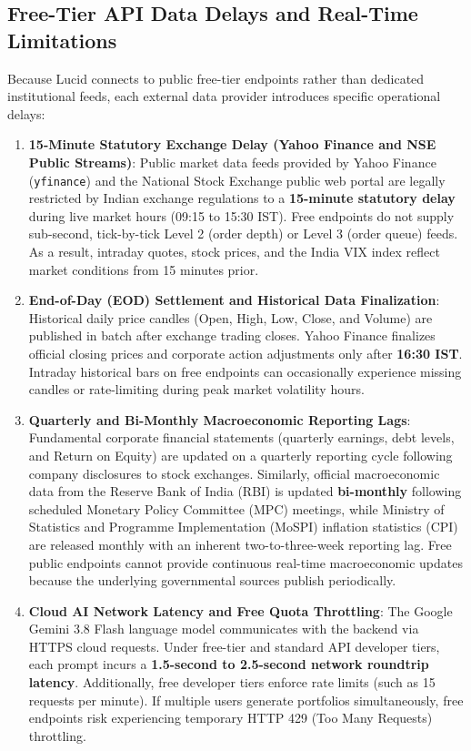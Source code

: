 \subsection{Free-Tier API Data Delays and Real-Time Limitations}
Because Lucid connects to public free-tier endpoints rather than dedicated institutional feeds, each external data provider introduces specific operational delays:
\begin{enumerate}
    \item \textbf{15-Minute Statutory Exchange Delay (Yahoo Finance and NSE Public Streams)}: 
    Public market data feeds provided by Yahoo Finance (\texttt{yfinance}) and the National Stock Exchange public web portal are legally restricted by Indian exchange regulations to a \textbf{15-minute statutory delay} during live market hours (09:15 to 15:30 IST). Free endpoints do not supply sub-second, tick-by-tick Level 2 (order depth) or Level 3 (order queue) feeds. As a result, intraday quotes, stock prices, and the India VIX index reflect market conditions from 15 minutes prior.
    
    \item \textbf{End-of-Day (EOD) Settlement and Historical Data Finalization}: 
    Historical daily price candles (Open, High, Low, Close, and Volume) are published in batch after exchange trading closes. Yahoo Finance finalizes official closing prices and corporate action adjustments only after \textbf{16:30 IST}. Intraday historical bars on free endpoints can occasionally experience missing candles or rate-limiting during peak market volatility hours.
    
    \item \textbf{Quarterly and Bi-Monthly Macroeconomic Reporting Lags}: 
    Fundamental corporate financial statements (quarterly earnings, debt levels, and Return on Equity) are updated on a quarterly reporting cycle following company disclosures to stock exchanges. Similarly, official macroeconomic data from the Reserve Bank of India (RBI) is updated \textbf{bi-monthly} following scheduled Monetary Policy Committee (MPC) meetings, while Ministry of Statistics and Programme Implementation (MoSPI) inflation statistics (CPI) are released monthly with an inherent two-to-three-week reporting lag. Free public endpoints cannot provide continuous real-time macroeconomic updates because the underlying governmental sources publish periodically.
    
    \item \textbf{Cloud AI Network Latency and Free Quota Throttling}: 
    The Google Gemini 3.8 Flash language model communicates with the backend via HTTPS cloud requests. Under free-tier and standard API developer tiers, each prompt incurs a \textbf{1.5-second to 2.5-second network roundtrip latency}. Additionally, free developer tiers enforce rate limits (such as 15 requests per minute). If multiple users generate portfolios simultaneously, free endpoints risk experiencing temporary HTTP 429 (Too Many Requests) throttling.
\end{enumerate}


